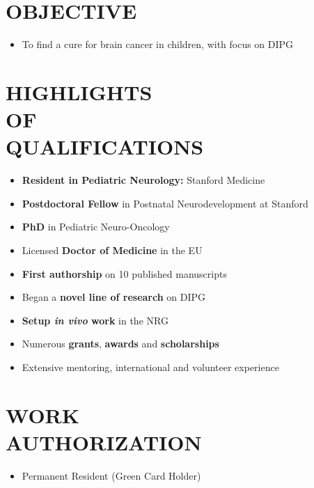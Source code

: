 \documentclass[line,margin]{res}
\begin{document}
\begin{resume}

\section{OBJECTIVE}
\begin{itemize}
\item {\small To find a cure for brain cancer in children, with focus on DIPG}
\end{itemize}

\section{HIGHLIGHTS \\ OF \\ QUALIFICATIONS}
\begin{itemize}
  \item {\small {\bf Resident in Pediatric Neurology:} Stanford Medicine}
  \item {\small {\bf Postdoctoral Fellow} in Postnatal Neurodevelopment at Stanford}
  \item {\small {\bf PhD} in Pediatric Neuro-Oncology}
  \item {\small Licensed {\bf Doctor of Medicine} in the EU}
  \item {\small {\bf First authorship} on 10 published manuscripts}
  \item {\small Began a {\bf novel line of research} on DIPG}
  \item {\small {\bf Setup \emph{in vivo} work} in the NRG}
  \item {\small Numerous {\bf grants}, {\bf awards} and {\bf scholarships}}
  \item {\small Extensive mentoring, international and volunteer experience}
\end{itemize}

\section{WORK \\ AUTHORIZATION}
\begin{itemize}
\item Permanent Resident (Green Card Holder)
\end{itemize}

\vspace{15pt}

\end{resume}
\end{document}
